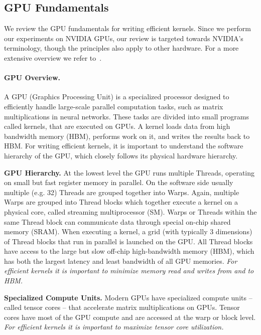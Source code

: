\documentclass{article}
\begin{document}
\subsection{GPU Fundamentals}
\label{app:gpu_fundamentals}
We review the GPU fundamentals for writing efficient kernels.
Since we perform our experiments on NVIDIA GPUs,
our review is targeted towards NVIDIA's terminology,
though the principles also apply to other hardware. %
For a more extensive overview we refer to~\citep{spector:24thunderkittens}.
\paragraph{GPU Overview.}
A GPU (Graphics Processing Unit) is a specialized processor designed to efficiently handle large-scale parallel computation tasks, such as matrix multiplications in neural networks.
These tasks are divided into small programs called kernels, that are executed on GPUs.
A kernel loads data from high bandwidth memory (HBM), performs work on it, and writes the results back to HBM.
For writing efficient kernels, it is important to understand the software hierarchy of the GPU, which closely follows its physical hardware hierarchy.

\textbf{GPU Hierarchy.}
At the lowest level the GPU runs multiple Threads, operating on small but fast register memory in parallel.
On the software side usually multiple (e.g. 32) Threads are grouped together into Warps.
Again, multiple Warps are grouped into Thread blocks which together execute a kernel on a physical core, called streaming multiprocessor (SM).
Warps or Threads within the same Thread block can communicate data through special on-chip shared memory (SRAM).
When executing a kernel, a grid (with typically 3 dimensions) of Thread blocks that run in parallel is launched on the GPU.
All Thread blocks have access to the large but slow off-chip high-bandwidth memory (HBM), which has both the largest latency and least bandwidth of all GPU memories.
\emph{For efficient kernels it is important to minimize memory read and writes from and to HBM.}

\textbf{Specialized Compute Units.}
Modern GPUs have specialized compute units -- called tensor cores -- that accelerate matrix multiplications on GPUs.
Tensor cores have most of the GPU compute and are accessed at the warp or block level.
\emph{For efficient kernels it is important to maximize tensor core utilization.}
\end{document}
